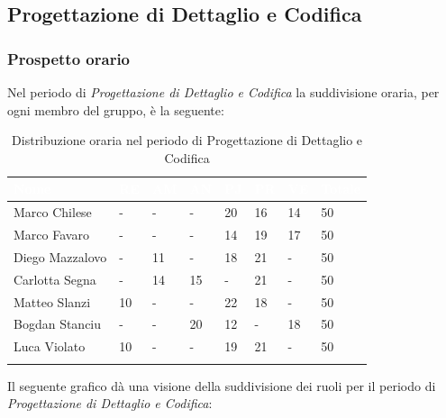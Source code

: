 \newpage
\subsection{Progettazione di Dettaglio e Codifica}
\label{PPDC}
\subsubsection{Prospetto orario}

Nel periodo di \textit{Progettazione di Dettaglio e Codifica} la suddivisione oraria, per ogni membro del gruppo, è la seguente:

\begin{longtable}{|C{.30\textwidth}|C{.06\textwidth}|C{.06\textwidth}|C{.06\textwidth} | C{.06\textwidth}| C{.06\textwidth} | C{.06\textwidth} | C{.10\textwidth} |}
	\hline
		\textbf{\textcolor{white}{Nome}} & \textbf{\textcolor{white}{RE}} & \textbf{\textcolor{white}{AM}} & \textbf{\textcolor{white}{AN}} & \textbf{\textcolor{white}{PJ}} & \textbf{\textcolor{white}{PR}} & \textbf{\textcolor{white}{VE}} & \textbf{\textcolor{white}{Totale}}\\
	\hline 
	Marco Chilese & - & - & - & 20 & 16 & 14 & 50 \\
	\hline
	Marco Favaro &  - & - & - & 14 & 19 & 17 & 50 \\
	\hline
	Diego Mazzalovo & - & 11 & - & 18 & 21 & - & 50 \\
	\hline
	Carlotta Segna & - & 14 & 15 & - & 21 & - & 50 \\
	\hline
	Matteo Slanzi & 10 & - & - & 22 & 18 & - & 50 \\
	\hline
	Bogdan Stanciu & - & - & 20 & 12 & - & 18 & 50 \\
	\hline
	Luca Violato & 10 & - & - & 19 & 21 & - & 50 \\   
	\hline


\caption{Distribuzione oraria nel periodo di Progettazione di Dettaglio e Codifica}
\label{Distribuzione oraria pdc}
\end{longtable}

Il seguente grafico dà una visione della suddivisione dei ruoli per il periodo di \textit{Progettazione di Dettaglio e Codifica}:

